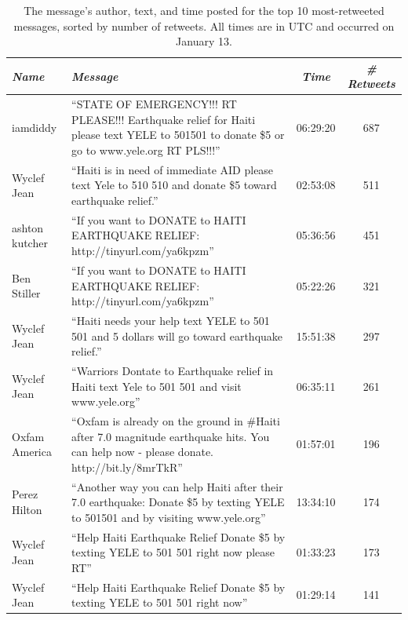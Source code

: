 \documentclass[a4paper, 11pt, titlepage]{article}
\begin{document}
\begin{center}
  \begin{table}[!ht]
    \tiny{
  \begin{tabular}{| l | p{8.0cm} | c | c |}
    \hline
    \textit{Name} & \textit{Message} & \textit{Time} & \textit{\# Retweets} \\
    \hline
    iamdiddy & ``STATE OF EMERGENCY!!! RT PLEASE!!! Earthquake relief for Haiti please text YELE to 501501 to donate \$5 or go to www.yele.org RT PLS!!!'' & 06:29:20 & 687 \\
    \hline
    Wyclef Jean & ``Haiti is in need of immediate AID please text Yele to 510 510 and donate \$5 toward earthquake relief.'' & 02:53:08 & 511\\
    \hline
    ashton kutcher & ``If you want to DONATE to HAITI EARTHQUAKE RELIEF: http://tinyurl.com/ya6kpzm'' & 05:36:56 & 451 \\
    \hline
    Ben Stiller & ``If you want to DONATE to HAITI EARTHQUAKE RELIEF: http://tinyurl.com/ya6kpzm'' & 05:22:26 & 321 \\
    \hline
    Wyclef Jean & ``Haiti needs your help text YELE to 501 501 and 5 dollars will go toward earthquake relief.'' & 15:51:38 & 297\\
    \hline
    Wyclef Jean & ``Warriors Dontate to Earthquake relief in Haiti text Yele to  501 501 and visit www.yele.org'' & 06:35:11 & 261 \\
    \hline
    Oxfam America & ``Oxfam is already on the ground in \#Haiti after 7.0 magnitude earthquake hits. You can help now - please donate. http://bit.ly/8mrTkR'' & 01:57:01 & 196 \\
    \hline
    Perez Hilton & ``Another way you can help Haiti after their 7.0 earthquake: Donate \$5 by texting YELE to 501501 and by visiting www.yele.org'' & 13:34:10 & 174 \\
    \hline
    Wyclef Jean & ``Help Haiti Earthquake Relief Donate \$5 by texting YELE to 501 501 right now please RT'' & 01:33:23 & 173 \\
    \hline
    Wyclef Jean & ``Help Haiti Earthquake Relief Donate \$5 by texting YELE to 501 501 right now'' & 01:29:14 & 141 \\
    \hline
  \end{tabular}
    }
  \label{ref:top_retweets_table}
  \caption{The message's author, text, and time posted for the top 10 most-retweeted messages, sorted by number of retweets.  All times are in UTC and occurred on January 13.}
  \end{table}
\end{center}
\end{document}
